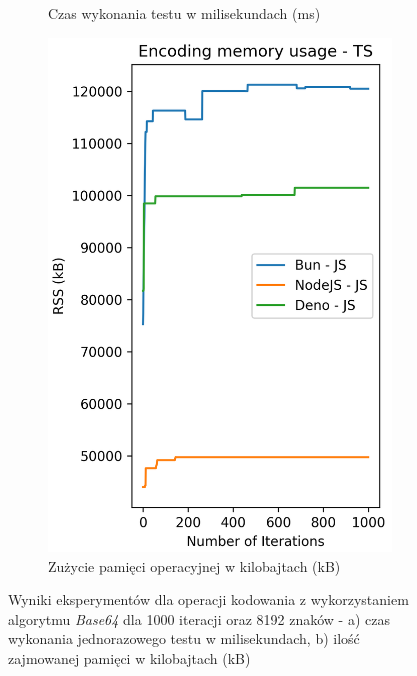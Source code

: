 \begin{figure}[H]
\begin{subfigure}[b]{0.44\textwidth}
    \caption{Czas wykonania testu w milisekundach (ms)}
    \label{fig:encoding_e2_js_time}
  \end{subfigure}
  \begin{subfigure}[b]{0.44\textwidth}
    \centering
    \includegraphics[width=\textwidth]{Figures/coding/base64_1000_encoding_js_memory.png}
    \caption{Zużycie pamięci operacyjnej w kilobajtach (kB)}
    \label{fig:encoding_e2_js_memory}
  \end{subfigure}
  \hfill
  \caption{Wyniki eksperymentów dla operacji kodowania z wykorzystaniem algorytmu \textit{Base64} dla 1000 iteracji oraz 8192 znaków - a) czas wykonania jednorazowego testu w milisekundach, b) ilość zajmowanej pamięci w kilobajtach (kB)}
  \label{fig:encoding_e2_js}
\end{figure}

